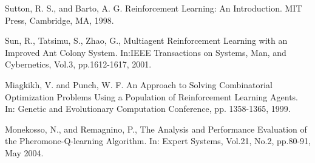 \begin{thebibliography}{9}
Sutton,  R.  S.,  and  Barto,  A.  G. Reinforcement  Learning:  An  Introduction.  MIT  Press, Cambridge, MA, 1998.

Sun,  R.,  Tatsimu,  S.,  Zhao,  G.,  Multiagent  Reinforcement  Learning  with  an  Improved Ant  Colony  System.  In:IEEE  Transactions  on  Systems,  Man,  and  Cybernetics,  Vol.3, pp.1612-1617, 2001.

 Miagkikh,  V.  and  Punch,  W.  F.  An  Approach  to  Solving  Combinatorial  Optimization Problems   Using   a   Population   of   Reinforcement   Learning   Agents.   In: Genetic   and Evolutionary Computation Conference, pp. 1358-1365, 1999. 

 Monekosso,  N.,  and  Remagnino,  P.,  The  Analysis  and  Performance  Evaluation  of  the Pheromone-Q-learning Algorithm. In: Expert Systems, Vol.21, No.2, pp.80-91, May 2004. 


\end{thebibliography}
